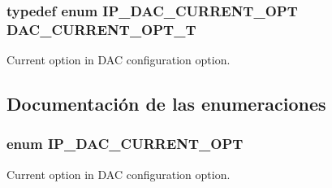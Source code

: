\subsubsection[{\texorpdfstring{D\+A\+C\+\_\+\+C\+U\+R\+R\+E\+N\+T\+\_\+\+O\+P\+T\+\_\+T}{DAC_CURRENT_OPT_T}}]{\setlength{\rightskip}{0pt plus 5cm}typedef enum {\bf I\+P\+\_\+\+D\+A\+C\+\_\+\+C\+U\+R\+R\+E\+N\+T\+\_\+\+O\+PT}  {\bf D\+A\+C\+\_\+\+C\+U\+R\+R\+E\+N\+T\+\_\+\+O\+P\+T\+\_\+T}}\hypertarget{group___d_a_c__18_x_x__43_x_x_ga590be276dee4e713d18efcb71e3d7a7c}{}\label{group___d_a_c__18_x_x__43_x_x_ga590be276dee4e713d18efcb71e3d7a7c}


Current option in D\+AC configuration option. 



\subsection{Documentación de las enumeraciones}
\subsubsection[{\texorpdfstring{I\+P\+\_\+\+D\+A\+C\+\_\+\+C\+U\+R\+R\+E\+N\+T\+\_\+\+O\+PT}{IP_DAC_CURRENT_OPT}}]{\setlength{\rightskip}{0pt plus 5cm}enum {\bf I\+P\+\_\+\+D\+A\+C\+\_\+\+C\+U\+R\+R\+E\+N\+T\+\_\+\+O\+PT}}\hypertarget{group___d_a_c__18_x_x__43_x_x_gae1ca4fc402c9d7e40090ce7897613194}{}\label{group___d_a_c__18_x_x__43_x_x_gae1ca4fc402c9d7e40090ce7897613194}


Current option in D\+AC configuration option. 

